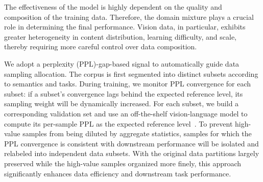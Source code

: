 \documentclass{article}
\begin{document}
The effectiveness of the model is highly dependent on the quality and composition of the training data. Therefore, the domain mixture plays a crucial role in determining the final performance. Vision data, in particular, exhibits greater heterogeneity in content distribution, learning difficulty, and scale, thereby requiring more careful control over data composition.

We adopt a perplexity (PPL)-gap-based signal to automatically guide data sampling allocation. The corpus is first segmented into distinct subsets according to semantics and tasks. During training, we monitor PPL convergence for each subset: if a subset’s convergence lags behind the expected reference level, its sampling weight will be dynamically increased. 
For each subset, we build a corresponding validation set and use an off-the-shelf vision-language model to compute its per-sample PPL as the expected reference level~\citep{DBLP:conf/nips/Xie0DDLLLL0Y23, DBLP:conf/iclr/MichelHN22}.
To prevent high-value samples from being diluted by aggregate statistics, samples for which the PPL convergence is consistent with downstream performance will be isolated and relabeled into independent data subsets.
With the original data partitions largely preserved while the high-value samples organized more finely, this approach significantly enhances data efficiency and downstream task performance.
\end{document}
